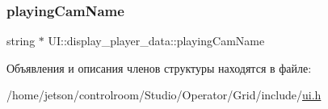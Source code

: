 \subsubsection{\texorpdfstring{playing\+Cam\+Name}{playingCamName}}
{\footnotesize\ttfamily string $\ast$ U\+I\+::display\+\_\+player\+\_\+data\+::playing\+Cam\+Name}



Объявления и описания членов структуры находятся в файле\+:\begin{DoxyCompactItemize}
\item 
/home/jetson/controlroom/\+Studio/\+Operator/\+Grid/include/\hyperlink{_operator_2_grid_2include_2ui_8h}{ui.\+h}\end{DoxyCompactItemize}
